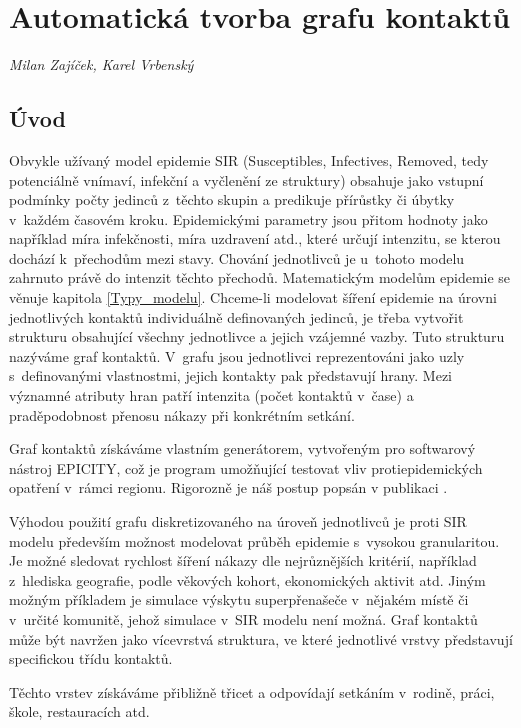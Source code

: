 
\chapter{Automatická tvorba grafu kontaktů}\label{Grafy_kontaktu}

\textit{Milan Zajíček, Karel Vrbenský}
\vspace{15mm}

\section*{Úvod}

Obvykle užívaný model epidemie SIR (Susceptibles, Infectives, Removed, tedy potenciálně vnímaví, infekční a vyčlenění ze struktury) obsahuje jako vstupní podmínky počty jedinců z~těchto skupin a predikuje přírůstky či úbytky v~každém časovém kroku. Epidemickými parametry jsou přitom hodnoty jako například míra infekčnosti, míra uzdravení atd., které určují intenzitu, se kterou dochází k~přechodům mezi stavy. Chování jednotlivců je u~tohoto modelu zahrnuto právě do intenzit těchto přechodů. Matematickým modelům epidemie se věnuje kapitola \ref{Typy_modelu}. Chceme-li modelovat šíření epidemie na úrovni jednotlivých kontaktů individuálně definovaných jedinců, je třeba vytvořit strukturu obsahující všechny jednotlivce a jejich vzájemné vazby. Tuto strukturu nazýváme graf kontaktů. V~grafu jsou jednotlivci reprezentováni jako uzly s~definovanými vlastnostmi, jejich kontakty pak představují hrany. Mezi významné atributy hran patří intenzita (počet kontaktů v~čase) a pra\-dě\-po\-dob\-nost přenosu nákazy při konkrétním setkání. 

Graf kontaktů získáváme vlastním generátorem, vytvořeným pro softwarový ná\-stroj EPICITY, což je program umožňující testovat vliv protiepidemických opatření v~rám\-ci regionu. Rigorozně je náš postup popsán v publikaci \cite{M-techrep2021}.

Výhodou použití grafu diskretizovaného na úroveň jednotlivců je proti SIR modelu především možnost modelovat průběh epidemie s~vysokou granularitou. Je možné sledovat rychlost šíření nákazy dle nejrůznějších kritérií, například z~hlediska geografie, podle věkových kohort, ekonomických aktivit atd.  Jiným možným příkladem je simulace výskytu superpřenašeče v~nějakém místě či v~určité komunitě, jehož simulace v~SIR modelu není možná.
Graf kontaktů může být navržen jako vícevrstvá struktura, ve které jednotlivé vrstvy představují specifickou třídu kontaktů. 


Těchto vrstev získáváme přibližně třicet a odpovídají setkáním v~rodině, práci, škole, restauracích atd.

